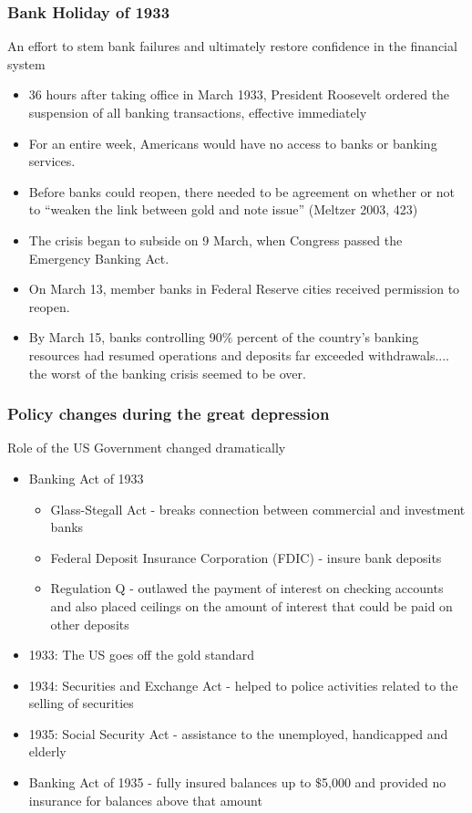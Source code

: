 \documentclass[11pt]{beamer}
\begin{document}
\begin{frame}
\frametitle{Bank Holiday of 1933}
An effort to stem bank failures and ultimately restore confidence in the financial system
\begin{itemize}
\item 36 hours after taking office in March 1933, President Roosevelt ordered the suspension of all banking transactions, effective immediately
\item For an entire week, Americans would have no access to banks or banking services.
\item Before banks could reopen, there needed to be agreement on whether or not to “weaken the link between gold and note issue” (Meltzer 2003, 423)
\item The crisis began to subside on 9 March, when Congress passed the Emergency Banking Act.
\item On March 13, member banks in Federal Reserve cities received permission to reopen.
\item By March 15, banks controlling 90$\%$ percent of the country’s banking resources had resumed operations and deposits far exceeded withdrawals.... the worst of the banking crisis seemed to be over.
\end{itemize}
\end{frame}





\begin{frame}
\frametitle{Policy changes during the great depression}

Role of the US Government changed dramatically

\begin{itemize}
\item Banking Act of 1933
\begin{itemize}
\item Glass-Stegall Act - breaks connection between commercial and investment banks
\item Federal Deposit Insurance Corporation (FDIC) - insure bank deposits
\item Regulation Q - outlawed the payment of interest on checking accounts and also placed ceilings on the amount of interest that could be paid on other deposits
\end{itemize}

\item 1933: The US goes off the gold standard
\item 1934: Securities and Exchange Act - helped to police activities related to the selling of securities
\item 1935: Social Security Act - assistance to the unemployed, handicapped and elderly
\item  Banking Act of 1935 - fully insured balances up to $\$$5,000 and provided no insurance for balances above that amount
\end{itemize}




\end{frame}
\end{document}
